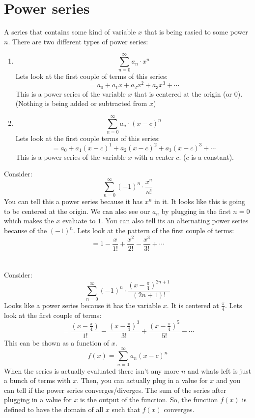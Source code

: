 \documentclass{report}
\begin{document}
\section{Power series}
    A series that contains some kind of variable \(x\) that is being rasied to some power \(n\).
    There are two different types of power series:
    \begin{enumerate}
        \item \[\sum_{n=0}^{\infty} a_n \cdot x^n\]
        Lets look at the first couple of terms of this series:
        \[= a_0 + a_1 x + a_2 x^2 + a_3 x^3 + \cdots\]
        This is a power series of the variable \(x\) that is centered at the origin (or 0).
        (Nothing is being added or subtracted from \(x\))
        \item \[\sum_{n = 0}^{\infty} a_n \cdot (x-c)^n \]
        Lets look at the first couple terms of this series:
        \[= a_0 + a_1 (x-c)^1 + a_2(x-c)^2 + a_3(x-c)^3 + \cdots\]
        This is a power series of the variable \(x\) with a center \(c\). 
        (\(c\) is a constant).
    \end{enumerate}
    Consider:
    \[\sum_{n = 0}^{\infty} (-1)^n \cdot \frac{x^n}{n!} \]
    You can tell this a power series because it has \(x^n\) in it.
    It looks like this is going to be centered at the origin.
    We can also see our \(a_n\) by plugging in the first \(n=0\) which makes the \(x\) evaluate to \(1\).
    You can also tell its an alternating power series because of the \((-1)^n\).
    Lets look at the pattern of the first couple of terms:
    \[= 1 - \frac{x}{1!} + \frac{x^2}{2!} - \frac{x^3}{3!} + \cdots\]\\
    \\
    Consider:
    \[\sum_{n=0}^{\infty} (-1)^n \cdot \frac{(x - \frac{\pi}{4})^{2n+1}}{(2n+1)!}\]
    Looks like a power series because it has the variable \(x\).
    It is centered at \(\frac{\pi}{4}\).
    Lets look at the first couple of terms:
    \[= \frac{(x - \frac{\pi}{4})}{1!} - \frac{(x - \frac{\pi}{4})^3}{3!} + \frac{(x - \frac{\pi}{4})^5}{5!} - \cdots\]
    This can be shown as a function of \(x\).
    \[f(x) = \sum_{n = 0}^{\infty} a_n (x - c)^n\]
    When the series is actually evaluated there isn't any more \(n\) and whats left is just a bunch of terms with \(x\).
    Then, you can actually plug in a value for \(x\) and you can tell if the power series converges/diverges.
    The sum of the series after plugging in a value for \(x\) is the output of the function.
    So, the function \(f(x)\) is defined to have the domain of all \(x\) such that \(f(x)\) converges.
\end{document}
